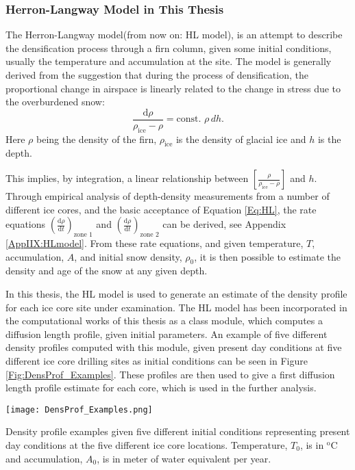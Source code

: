\documentclass[../../CompleteThesis2/Complete_2ndDraft]{subfiles}
\begin{document}
\subsubsection[HL in This Thesis]{Herron-Langway Model in This Thesis}
\label{Subsubsec:Ice_DiffusionAndDensification_Densification_HLmodel}
The Herron-Langway model(from now on: HL model), is an attempt to describe the densification process through a firn column, given some initial conditions, usually the temperature and accumulation at the site. The model is generally derived from the suggestion that during the process of densification, the proportional change in airspace is linearly related to the change in stress due to the overburdened snow:
\begin{equation}
	\frac{\text{d}\rho}{\rho_{\text{ice}} - \rho} = \text{const. } \rho \, dh.
	\label{Eq:HL}
\end{equation}
Here $\rho$ being the density of the firn, $\rho_{\text{ice}}$ is the density of glacial ice and $h$ is the depth.

This implies, by integration, a linear relationship between $\left[\frac{\rho}{\rho_{\text{ice}} - \rho}\right]$ and $h$. Through empirical analysis of depth-density measurements from a number of different ice cores, and the basic acceptance of Equation \ref{Eq:HL}, the rate equations $\left(\frac{\text{d}\rho}{\text{d}t}\right)_{\text{zone 1}}$ and $\left(\frac{\text{d}\rho}{\text{d}t}\right)_{\text{zone 2}}$ can be derived, see Appendix \ref{AppIIX:HLmodel}. From these rate equations, and given temperature, $T$, accumulation, $A$, and initial snow density, $\rho_0$, it is then possible to estimate the density and age of the snow at any given depth. 

In this thesis, the HL model is used to generate an estimate of the density profile for each ice core site under examination. The HL model has been incorporated in the computational works of this thesis as a class module, which computes a diffusion length profile, given initial parameters. An example of five different density profiles computed with this module, given present day conditions at five different ice core drilling sites as initial conditions can be seen in Figure \ref{Fig:DensProf_Examples}. These profiles are then used to give a first diffusion length profile estimate for each core, which is used in the further analysis. 

\begin{marginfigure}
	\centering
	\texttt{[image: DensProf\_Examples.png]}
	\caption{Density profile examples given five different initial conditions representing present day conditions at the five different ice core locations. Temperature, $T_0$, is in $^{\text{o}}$C and accumulation, $A_0$, is in meter of water equivalent per year.}
	\label{Fig:DensProf_Examples}
\end{marginfigure}
\end{document}

